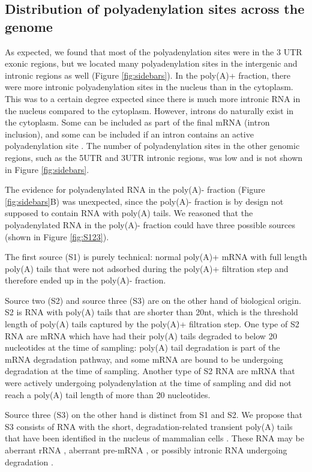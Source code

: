 \subsection{Distribution of polyadenylation sites across the genome}
As expected, we found that most of the polyadenylation sites were in the 3\ppp
UTR exonic regions, but we located many polyadenylation sites in the intergenic
and intronic regions as well (Figure \ref{fig:sidebars}). In the poly(A)+
fraction, there were more intronic polyadenylation sites in the nucleus than in
the cytoplasm. This was to a certain degree expected since there is much more
intronic RNA in the nucleus compared to the cytoplasm. However, introns do
naturally exist in the cytoplasm. Some can be included as part of the final
mRNA (intron inclusion), and some can be included if an intron contains an
active polyadenylation site \cite{tian_widespread_2007}. The number of
polyadenylation sites in the other genomic regions, such as the 5\ppp UTR and
3\ppp UTR intronic regions, was low and is not shown in Figure
\ref{fig:sidebars}.

The evidence for polyadenylated RNA in the poly(A)- fraction (Figure
\ref{fig:sidebars}B) was unexpected, since the poly(A)- fraction is by design
not supposed to contain RNA with poly(A) tails. We reasoned that the
polyadenylated RNA in the poly(A)- fraction could have three possible sources
(shown in Figure \ref{fig:S123}).

The first source (S1) is purely technical: normal poly(A)+ mRNA with full
length poly(A) tails that were not adsorbed during the poly(A)+ filtration step
and therefore ended up in the poly(A)- fraction.

Source two (S2) and source three (S3) are on the other hand of biological
origin. S2 is RNA with poly(A) tails that are shorter than 20nt, which is the
threshold length of poly(A) tails captured by the poly(A)+ filtration
step. One type of S2 RNA are mRNA which have had their poly(A) tails degraded to
below 20 nucleotides at the time of sampling: poly(A) tail degradation is part
of the mRNA degradation pathway, and some mRNA are bound to be undergoing
degradation at the time of sampling. Another type of S2 RNA are mRNA that were
actively undergoing polyadenylation at the time of sampling and did not reach a
poly(A) tail length of more than 20 nucleotides.

Source three (S3) on the other hand is distinct from S1 and S2. We propose that
S3 consists of RNA with the short, degradation-related transient poly(A) tails
that have been identified in the nucleus of mammalian cells
\cite{lemay_nuclear_2010}.  These RNA may be aberrant rRNA
\cite{shcherbik_polyadenylation_2010}, aberrant pre-mRNA
\cite{west_adenylation_2006}, or possibly intronic RNA undergoing degradation
\cite{schmidt_polyadenylation_2010}.

